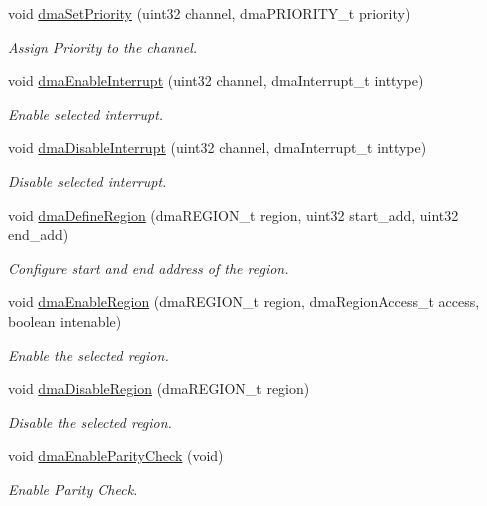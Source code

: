 \begin{DoxyCompactItemize}
void \mbox{\hyperlink{group__DMA_gafb14fbff92909515493f828a2073e32e}{dma\+Set\+Priority}} (uint32 channel, dma\+P\+R\+I\+O\+R\+I\+T\+Y\+\_\+t priority)
\begin{DoxyCompactList}\small\item\em Assign Priority to the channel. \end{DoxyCompactList}\item 
void \mbox{\hyperlink{group__DMA_ga55e0af7aeb95a528b05aec15001a6db6}{dma\+Enable\+Interrupt}} (uint32 channel, dma\+Interrupt\+\_\+t inttype)
\begin{DoxyCompactList}\small\item\em Enable selected interrupt. \end{DoxyCompactList}\item 
void \mbox{\hyperlink{group__DMA_ga615b558e379e8a29221fc6be771d7c4e}{dma\+Disable\+Interrupt}} (uint32 channel, dma\+Interrupt\+\_\+t inttype)
\begin{DoxyCompactList}\small\item\em Disable selected interrupt. \end{DoxyCompactList}\item 
void \mbox{\hyperlink{group__DMA_gaca7cb872ee27f6e977d50a01cbf6c6c0}{dma\+Define\+Region}} (dma\+R\+E\+G\+I\+O\+N\+\_\+t region, uint32 start\+\_\+add, uint32 end\+\_\+add)
\begin{DoxyCompactList}\small\item\em Configure start and end address of the region. \end{DoxyCompactList}\item 
void \mbox{\hyperlink{group__DMA_gac3b7143e56e44b8e34ec350878e5f6df}{dma\+Enable\+Region}} (dma\+R\+E\+G\+I\+O\+N\+\_\+t region, dma\+Region\+Access\+\_\+t access, boolean intenable)
\begin{DoxyCompactList}\small\item\em Enable the selected region. \end{DoxyCompactList}\item 
void \mbox{\hyperlink{group__DMA_ga70ded995f289b44465e9421bacacad8e}{dma\+Disable\+Region}} (dma\+R\+E\+G\+I\+O\+N\+\_\+t region)
\begin{DoxyCompactList}\small\item\em Disable the selected region. \end{DoxyCompactList}\item 
void \mbox{\hyperlink{group__DMA_ga4a1f74ec4b9f535082c2a54bdf9d6302}{dma\+Enable\+Parity\+Check}} (void)
\begin{DoxyCompactList}\small\item\em Enable Parity Check. \end{DoxyCompactList}\item 

\end{DoxyCompactItemize}
